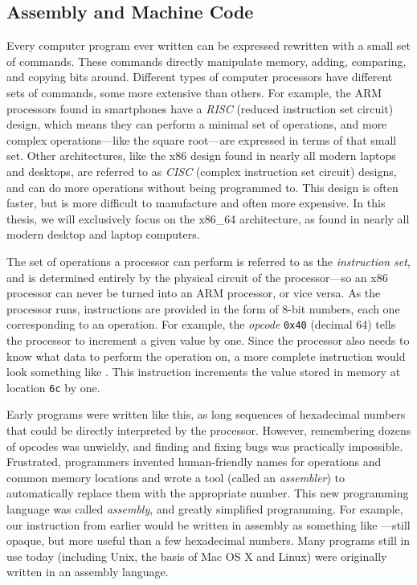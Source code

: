 \documentclass[12pt,twoside]{reedthesis}
\begin{document}
\subsection{Assembly and Machine Code}
Every computer program ever written can be expressed rewritten with a small set of commands. These commands directly manipulate memory, adding, comparing, and copying bits around. Different types of computer processors have different sets of commands, some more extensive than others. For example, the ARM processors found in smartphones have a \emph{RISC} (reduced instruction set circuit) design, which means they can perform a minimal set of operations, and more complex operations---like the square root---are expressed in terms of that small set. Other architectures, like the x86 design found in nearly all modern laptops and desktops, are referred to as \emph{CISC} (complex instruction set circuit) designs, and can do more operations without being programmed to. This design is often faster, but is more difficult to manufacture and often more expensive. In this thesis, we will exclusively focus on the x86\_64 architecture, as found in nearly all modern desktop and laptop computers.

The set of operations a processor can perform is referred to as the \emph{instruction set}, and is determined entirely by the physical circuit of the processor---so an x86 processor can never be turned into an ARM processor, or vice versa. As the processor runs, instructions are provided in the form of 8-bit numbers, each one corresponding to an operation. For example, the \emph{opcode} \texttt{0x40} (decimal 64) tells the processor to increment a given value by one. Since the processor also needs to know what data to perform the operation on, a more complete instruction would look something like . This instruction increments the value stored in memory at location \texttt{6c} by one.

Early programs were written like this, as long sequences of hexadecimal numbers that could be directly interpreted by the processor. However, remembering dozens of opcodes was unwieldy, and finding and fixing bugs was practically impossible. Frustrated, programmers invented human-friendly names for operations and common memory locations and wrote a tool (called an \emph{assembler}) to automatically replace them with the appropriate number. This new programming language was called \emph{assembly}, and greatly simplified programming. For example, our instruction from earlier would be written in assembly as something like ---still opaque, but more useful than a few hexadecimal numbers. Many programs still in use today (including Unix, the basis of Mac OS X and Linux) were originally written in an assembly language.
\end{document}

